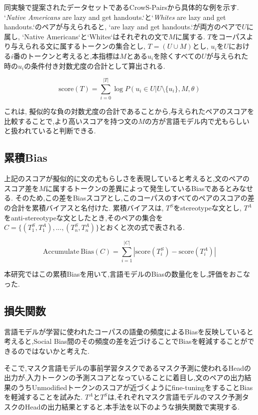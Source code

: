 \documentclass[
  platex, dvipdfmx %
]{nlp2021}
\begin{document}
同実験で提案されたデータセットであるCrowS-Pairsから具体的な例を示す. `\emph{Native Americans} are lazy and get handouts.`と`\emph{Whites} are lazy and get handouts.`のペアが与えられると, `are lazy and get handouts.`が両方のペアで$U$に属し, `Native Americans`と`Whites`はそれぞれの文で$M$に属する.
$T$をコーパスより与えられる文に属するトークンの集合とし, $T = (U \cup M)$とし, $u_i$を$U$における$i$番のトークンと考えると,本指標は$M$とある$u_i$を除くすべての$U$が与えられた時の$u_i$の条件付き対数尤度の合計として算出される.

\begin{equation}
\label{eq:pseudo_log_likelihood}
\mathrm{score}(T) = \sum_{i=0}^{|T|}{\log{P(u_i \in U | U \setminus \{u_i\}, M, \theta)}}
\end{equation}

これは, 擬似的な負の対数尤度の合計であることから,与えられたペアのスコアを比較することで,より高いスコアを持つ文の$M$の方が言語モデル内で尤もらしいと扱われていると判断できる.

\subsection{累積Bias}
上記のスコアが擬似的に文の尤もらしさを表現していると考えると,文のペアのスコア差を$M$に属するトークンの差異によって発生しているBiasであるとみなせる.
そのため,この差をBiasスコアとし,このコーパスのすべてのペアのスコアの差の合計を累積バイアスと名付けた.
累積バイアスは, $T^S$をstereotypeな文とし, $T^A$をanti-stereotypeな文としたとき,そのペアの集合を$C = \{(T_1^S, T_1^A), ... , (T_n^S, T_n^A)\}$とおくと次の式で表される.

\begin{equation}
\label{eq:bias_score}
\mathrm{Accumulate\ Bias}(C) = \sum_{i=1}^{|C|}|\mathrm{score}(T_i^S) - \mathrm{score}(T_i^A)|
\end{equation}

本研究ではこの累積Biasを用いて,言語モデルのBiasの数量化をし,評価をおこなった.

\subsection{損失関数}
言語モデルが学習に使われたコーパスの語彙の頻度によるBiasを反映していると考えると,Social Bias間のその頻度の差を近づけることでBiasを軽減することができるのではないかと考えた.

そこで,マスク言語モデルの事前学習タスクであるマスク予測に使われるHeadの出力が,入力トークンの予測スコアとなっていることに着目し,文のペアの出力結果のうちUnmodifiedトークンのスコアが近づくようにfine-tuningをすることBiasを軽減することを試みた.
$T^A$と$T^S$は,それぞれマスク言語モデルのマスク予測タスクのHeadの出力結果とすると,本手法を以下のような損失関数で実現する.
\end{document}
